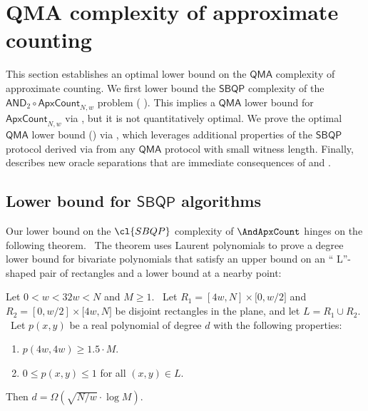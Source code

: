 \section{QMA complexity of approximate counting}

\label{sec:SBPQMA}

This section establishes
an 
optimal lower bound on the $\mathsf{QMA}$
complexity of approximate counting.
We first lower bound the $\mathsf{SBQP}$ complexity
of the $\mathsf{AND}_2 \circ \mathsf{ApxCount}_{N,w}$ problem (
). 
This implies a $\mathsf{QMA}$ lower bound
for $\mathsf{ApxCount}_{N,w}$ via ,
but it is not quantitatively optimal. 
We prove the optimal $\mathsf{QMA}$ lower bound 
() via
, which
leverages additional properties 
of 
the $\mathsf{SBQP}$ protocol derived via
from any $\mathsf{QMA}$ protocol with small
witness length. Finally, 
describes new oracle separations that
are immediate consequences of  and . 

%
\subsection{Lower bound for \texorpdfstring{$\mathsf{SBQP}$}{SBQP} algorithms}
\label{sec:SBQP} 

Our lower bound on the $\cl{SBQP}$ complexity of $\AndApxCount$ hinges 
on the following theorem. \ The theorem
uses Laurent polynomials to prove a degree lower bound for bivariate
polynomials that satisfy an upper bound on an \textquotedblleft
L\textquotedblright -shaped pair of rectangles and a lower bound at a nearby
point:

\begin{theorem}
\label{thm:L} Let $0<w<32w<N$ and $M\geq 1$. \ Let $R_{1}=[4w,N]\times \lbrack 0,w/2]$ and
$R_{2}=[0,w/2]\times \lbrack 4w,N]$ be disjoint rectangles in the plane, and
let $L=R_{1}\cup R_{2}$. \ Let $p(x,y)$ be a real polynomial of degree $d$
with the following properties:
\begin{enumerate}
\item $p(4w, 4w) \ge 1.5 \cdot M$.
\item $0 \le p(x, y) \le 1$ for all $(x, y) \in L$.
\end{enumerate}
Then $d = \Omega(\sqrt{N/w} \cdot \log M)$.
\end{theorem}

